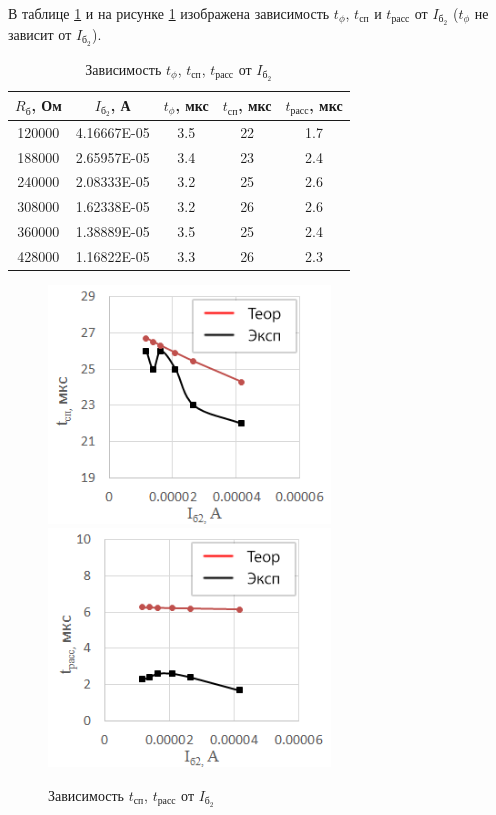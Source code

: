 В таблице \ref{tab:ib2} и на рисунке \ref{fig:ib2} изображена зависимость $t_\phi$, $t_\text{сп}$ и $t_\text{расс}$ от $I_{\text{б}_2}$ ($t_\phi$ не зависит от $I_{\text{б}_2}$).

\begin{table}[H]
	\begin{center}
	\caption{Зависимость $t_\phi$, $t_\text{сп}$, $t_\text{расс}$ от $I_{\text{б}_2}$}
		\begin{tabular}{|c|c|c|c|c|}
		\hline 
		$R_\text{б}$, Ом & $I_{\text{б}_2}$, А & $t_\phi$, мкс & $t_\text{сп}$, мкс & $t_\text{расс}$, мкс \\ 
		\hline 
		120000 & 4.16667E-05 & 3.5 & 22 & 1.7 \\
		\hline
		188000 & 2.65957E-05 & 3.4 & 23 & 2.4 \\
		\hline
		240000 & 2.08333E-05 & 3.2 & 25	& 2.6 \\
		\hline
		308000 & 1.62338E-05 & 3.2 & 26 & 2.6 \\
		\hline
		360000 & 1.38889E-05 & 3.5 & 25 & 2.4 \\
		\hline
		428000 & 1.16822E-05 & 3.3 & 26 & 2.3 \\
		\hline
		\end{tabular} 
		\label{tab:ib2}
	\end{center}
\end{table}
\vspace{-1.5cm}
\begin{figure}[H]
	\begin{center}
		\includegraphics[width=7.5cm]{img/tsp_ib2}
		\includegraphics[width=7.5cm]{img/trass_ib2}
		\caption{Зависимость $t_\text{сп}$, $t_\text{расс}$ от $I_{\text{б}_2}$}
		\label{fig:ib2} %
	\end{center}
\end{figure}

